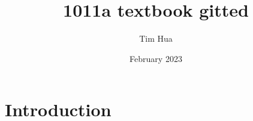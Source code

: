 \documentclass{article}
\title{1011a textbook gitted}
\author{Tim Hua}
\date{February 2023}
\begin{document}
\maketitle

\section{Introduction}
\end{document}

